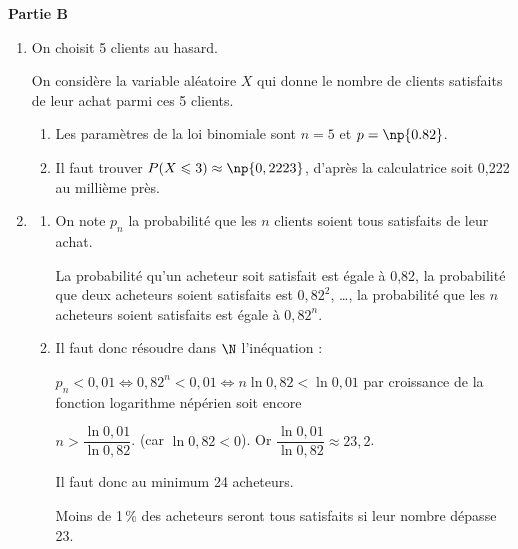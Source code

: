\medskip

\textbf{Partie B}

\medskip

\begin{enumerate}
\item On choisit 5 clients au hasard.

On considère la variable aléatoire $X$ qui donne le
nombre de clients satisfaits de leur achat parmi ces 5 clients.
	\begin{enumerate}
		\item 
Les paramètres de la loi binomiale sont $ n = 5 $ \quad et \quad  $ p=\np{0.82}$.
		\item 
		

Il faut trouver $P(X \leqslant 3) \approx \np{0,2223}$, d'après la calculatrice soit 0,222 au millième près.
	\end{enumerate}
\item 


	\begin{enumerate}
		\item On note $p_n$ la probabilité que les $n$ clients soient tous satisfaits de leur achat.


La probabilité qu'un acheteur soit satisfait est égale à 0,82, la probabilité que deux acheteurs soient satisfaits est $0,82^2$, \ldots, la probabilité que les $n$ acheteurs soient satisfaits est égale à $0,82^n$.
		\item 
		

Il faut donc résoudre dans $\N$ l'inéquation :

$p_n < 0,01 \iff 0,82^n < 0,01 \iff n \ln 0,82 < \ln 0,01$ par croissance de la fonction logarithme népérien soit encore 

$n > \dfrac{\ln 0,01}{\ln 0,82}$. (car $\ln 0,82 < 0$). Or $\dfrac{\ln 0,01}{\ln 0,82} \approx 23,2$.

Il faut donc au minimum 24 acheteurs.

Moins de 1\,\% des acheteurs seront tous satisfaits si leur nombre dépasse 23.
	\end{enumerate}
\end{enumerate}

\bigskip
